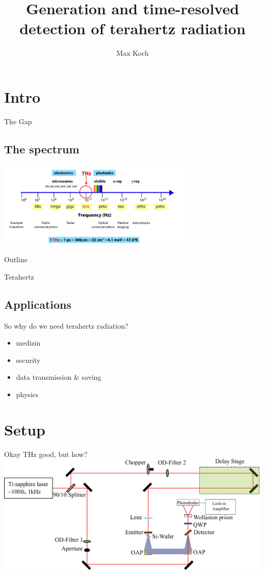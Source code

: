 \documentclass[aspectratio=1610, 9pt]{beamer}
\title{Generation and time-resolved detection of
terahertz radiation}
\author[M.~Koch]{Max Koch}
\institute[AG Wang]{Arbeitsgruppe Wang \\  Fakultät Physik}
\begin{document}
\maketitle

\section{Intro}

\begin{frame}{The Gap}
  \subsection{The spectrum}
  \begin{center}
  \includegraphics[width=0.7\textwidth]{images/spectrum.png}
  \end{center}
\end{frame}

\begin{frame}{Outline}
  \tableofcontents
\end{frame}

\begin{frame}{Terahertz}
  \subsection{Applications}
  So why do we need terahertz radiation?
  \begin{itemize}
    \item medizin
    \item security
    \item data transmission \& saving
    \item physics
  \end{itemize}
\end{frame}

\section{Setup}

\begin{frame}{Okay THz good, but how?}
  \includegraphics[width=\textwidth]{images/Aufbau.pdf}
\end{frame}
\end{document}
